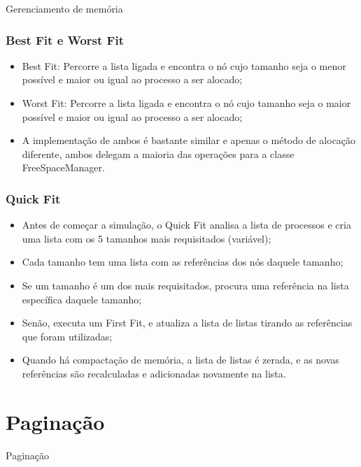 \documentclass{beamer}
\begin{document}
\begin{frame}
\begin{center}
\huge Gerenciamento de memória
\end{center}
\end{frame}

\begin{frame}
\frametitle{Best Fit e Worst Fit}
\begin{itemize}
\item Best Fit: Percorre a lista ligada e encontra o nó cujo tamanho seja o menor possível e maior ou igual ao processo a ser alocado;
\item Worst Fit: Percorre a lista ligada e encontra o nó cujo tamanho seja o maior possível e maior ou igual ao processo a ser alocado;
\item A implementação de ambos é bastante similar e apenas o método de alocação diferente, ambos delegam a maioria das operações para a classe FreeSpaceManager.
\end{itemize}
\end{frame}

\begin{frame}
\frametitle{Quick Fit}
\begin{itemize}
\item Antes de começar a simulação, o Quick Fit analisa a lista de processos e cria uma lista com os 5 tamanhos mais requisitados (variável);
\item Cada tamanho tem uma lista com as referências dos nós daquele tamanho;
\item Se um tamanho é um dos mais requisitados, procura uma referência na lista específica daquele tamanho;
\item Senão, executa um First Fit, e atualiza a lista de listas tirando as referências que foram utilizadas;
\item Quando há compactação de memória, a lista de listas é zerada, e as novas referências são recalculadas e adicionadas novamente na lista.
\end{itemize}
\end{frame}

\section{Paginação}

\begin{frame}
\begin{center}
\huge Paginação
\end{center}
\end{frame}
\end{document}
